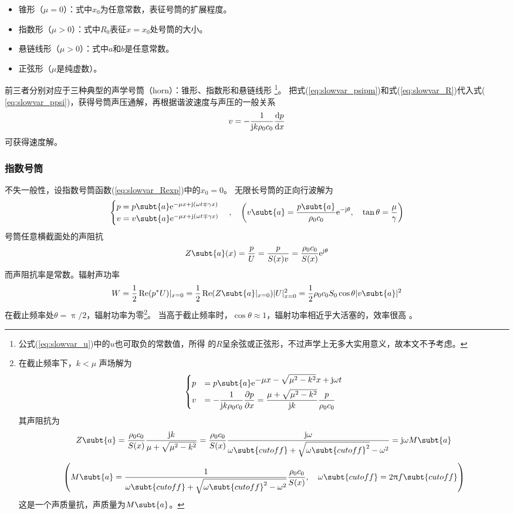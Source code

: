 \documentclass[UTF8]{ctexbook}
\begin{document}
\begin{itemize}
	\item 锥形（$\mu=0$）：式中$x_0$为任意常数，表征号筒的扩展程度。
	\item 指数形（$\mu>0$）：式中$R_0$表征$x=x_0$处号筒的大小。
	\item 悬链线形（$\mu>0$）：式中$a$和$b$是任意常数。
	\item 正弦形（$\mu$是纯虚数）。
\end{itemize}

前三者分别对应于三种典型的声学号筒（horn）：锥形、指数形和悬链线形
\footnote{公式(\ref{eq:slowvar_u})中的$u$也可取负的常数值，所得
的$R$呈余弦或正弦形，不过声学上无多大实用意义，故本文不予考虑。}。
把式(\ref{eq:slowvar_psipm})和式(\ref{eq:slowvar_R})代入式(
\ref{eq:slowvar_ppsi})，获得号筒声压通解，再根据谐波速度与声压的一般关系
$$
v=-\frac{1}{\mathrm{j} k\rho_0c_0} \dv{p}{x}
$$
可获得速度解。

\subsubsection{指数号筒}
不失一般性，设指数号筒函数(\ref{eq:slowvar_Rexp})中的$x_0=0$。
无限长号筒的正向行波解为
\begin{equation}
	\begin{cases}
		p = p\subt{a}\me^{-\mu x+\mj(\omega t \mp \gamma x)}\\
		v = v\subt{a} \me^{-\mu x + \mj (\omega t\mp \gamma x)}
	\end{cases}
	\qc 
	\qty(v\subt{a} = \frac{p\subt{a}}{\rho_0c_0} \me^{-\mj \theta}\qc
	\tan\theta = \frac{\mu}{\gamma})
\end{equation}
号筒任意横截面处的声阻抗
\begin{equation}
	Z\subt{a}(x) = \frac{p}{U} = \frac{p}{S(x)v}
	=\frac{\rho_0c_0}{S(x)} \me^{\mj \theta}
\end{equation}
而声阻抗率是常数。辐射声功率
$$
W = \frac12 \Re(p^* U)|_{x=0}
=\frac{1}{2} \Re(Z\subt{a}|_{x=0}) |U|_{x=0}^2
=\frac12 \rho_0 c_0 S_0 \cos\theta |v\subt{a}|^2
$$
在截止频率处$\theta =\uppi /2$，辐射功率为零\footnote{在截止频率下，$k<\mu$
	声场解为
	$$
	\begin{cases}
		\displaystyle p &\displaystyle =p\subt{a} \me^{\displaystyle
			-\mu x - \sqrt{\mu^2-k^2}x+\mj \omega
	t}\\
	\displaystyle v&\displaystyle =-\frac{1}{\mj k\rho_0c_0} \pdv{p}{x}
	=\frac{\mu+ \sqrt{\mu^2-k^2}}{\mj k} \frac{p}{\rho_0c_0}
	\end{cases}
$$
其声阻抗为
$$Z\subt{a} = \frac{\rho_0c_0}{S(x)} \frac{\mj k}{\mu +\sqrt{\mu^2-k^2}}
=\frac{\rho_0c_0}{S(x)} \frac{\mj \omega}{\omega\subt{cutoff}+\sqrt{\omega\subt{cutoff}^2}
-\omega^2}
=\mj \omega M\subt{a}
$$
$$
\qty(\displaystyle M\subt{a} = \frac{1}{\omega\subt{cutoff}+\sqrt{\omega\subt{cutoff}^2-\omega^2}}
\frac{\rho_0c_0}{S(x)}\qc 
\omega\subt{cutoff}=2\uppi f\subt{cutoff})$$
这是一个声质量抗，声质量为$M\subt{a}$。
}。
当高于截止频率时，$\cos \theta \approx 1$，辐射功率相近乎大活塞的，效率很高
。
\end{document}
